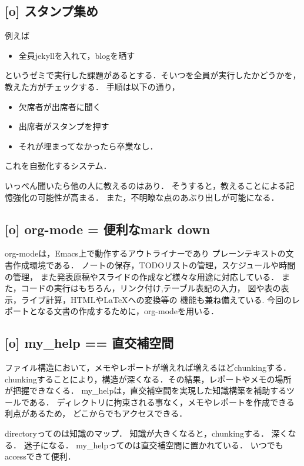 \documentclass{hissymp}
\begin{document}
\subsection{[o] スタンプ集め}
\label{sec:org005b5ed}
例えば
\begin{itemize}
\item 全員jekyllを入れて，blogを晒す
\end{itemize}
というゼミで実行した課題があるとする．そいつを全員が実行したかどうかを，教えた方がチェックする．
手順は以下の通り，
\begin{itemize}
\item 欠席者が出席者に聞く
\item 出席者がスタンプを押す
\item それが埋まってなかったら卒業なし．
\end{itemize}
これを自動化するシステム．

いっぺん聞いたら他の人に教えるのはあり．
そうすると，教えることによる記憶強化の可能性が高まる．
また，不明瞭な点のあぶり出しが可能になる．

\subsection{[o] org-mode = 便利なmark down}
\label{sec:orga9b7b2a}
org-modeは，Emacs上で動作するアウトライナーであり
プレーンテキストの文書作成環境である．
ノートの保存，TODOリストの管理，スケジュールや時間の管理，
また発表原稿やスライドの作成など様々な用途に対応している．
また，コードの実行はもちろん，リンク付け,テーブル表記の入力，
図や表の表示，ライブ計算，HTMLや\LaTeX{}への変換等の
機能も兼ね備えている.
今回のレポートとなる文書の作成するために，org-modeを用いる．

\subsection{[o] my\_help == 直交補空間}
\label{sec:orgcec17ac}
ファイル構造において，メモやレポートが増えれば増えるほどchunkingする．
chunkingすることにより，構造が深くなる．その結果，レポートやメモの場所
が把握できなくる．
my\_helpは，直交補空間を実現した知識構築を補助するツールである．
ディレクトリに拘束される事なく，メモやレポートを作成できる利点があるため，
どこからでもアクセスできる．

directoryってのは知識のマップ．
知識が大きくなると，chunkingする．
深くなる．
迷子になる．
my\_helpってのは直交補空間に置かれている．
いつでもaccessできて便利．
\end{document}
